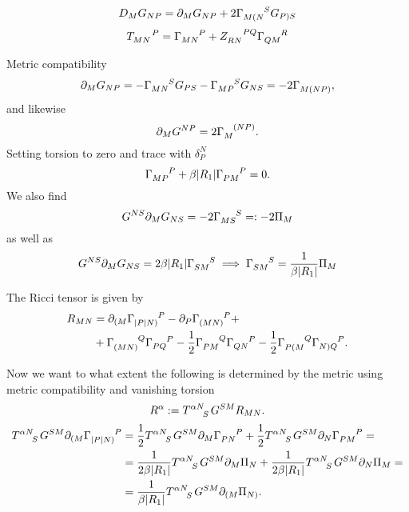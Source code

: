 \documentclass{article}
\begin{document}
\begin{equation}
    D_MG_{NP} = \pd_M G_{NP}+2\tensor{\Gamma}{_{M(N}^S}G_{P)S}
\end{equation}
\begin{equation}
    \tensor{T}{_{MN}^P} = \tensor{\Gamma}{_{MN}^P}+\tensor{Z}{_{RN}^{PQ}}\tensor{\Gamma}{_{QM}^R}
\end{equation}

Metric compatibility 
\begin{equation}
    \pd_MG_{NP} = -\tensor{\Gamma}{_{MN}^S}G_{PS}-\tensor{\Gamma}{_{MP}^S}G_{NS} = -2\tensor{\Gamma}{_{M(NP)}},
\end{equation}
and likewise 
\begin{equation}
    \pd_MG^{NP} = 2\tensor{\Gamma}{_{M}^{(NP)}}.
\end{equation}
Setting torsion to zero and trace with $\delta_P^N$
\begin{equation}
    \tensor{\Gamma}{_{MP}^P}+\beta |R_1|\tensor{\Gamma}{_{PM}^P}=0.
\end{equation}
We also find 
\begin{equation}
    G^{NS}\pd_MG_{NS} = -2\tensor{\Gamma}{_{MS}^S} =: -2\Pi_M
\end{equation}
as well as 
\begin{equation}
    G^{NS}\pd_M G_{NS} = 2\beta |R_1|\tensor{\Gamma}{_S_M^S} \implies \tensor{\Gamma}{_S_M^S}=\frac{1}{\beta|R_1|}\Pi_M
\end{equation}

The Ricci tensor is given by 
\begin{align*}
    R_{MN} &= \pd_{(M}\tensor{\Gamma}{_{|P|N)}^P}-\pd_P\tensor{\Gamma}{_{(MN)}^P}+\\
    &+\tensor{\Gamma}{_{(MN)}^Q}\tensor{\Gamma}{_{PQ}^P}-\frac{1}{2}\tensor{\Gamma}{_{PM}^Q}\tensor{\Gamma}{_{QN}^P}-\frac{1}{2}\tensor{\Gamma}{_{P(M}^Q}\tensor{\Gamma}{_{N)Q}^P}.
\end{align*}

Now we want to what extent the following is determined by the metric using metric compatibility and vanishing torsion
\begin{equation}
    R^\alpha := \tensor{T}{^\alpha^N_{S}}G^{SM}R_{MN}.
\end{equation}
\begin{align}
    \tensor{T}{^\alpha^N_{S}}G^{SM}\pd_{(M}\tensor{\Gamma}{_{|P|N)}^P} &= \frac{1}{2}\tensor{T}{^\alpha^N_{S}}G^{SM}\pd_{M}\tensor{\Gamma}{_{PN}^P}+\frac{1}{2}\tensor{T}{^\alpha^N_{S}}G^{SM}\pd_{N}\tensor{\Gamma}{_{PM}^P} =\\
    &= \frac{1}{2\beta|R_1|}\tensor{T}{^\alpha^N_{S}}G^{SM}\pd_M\Pi_N+\frac{1}{2\beta |R_1|}\tensor{T}{^\alpha^N_{S}}G^{SM}\pd_N\Pi_M=\\
    &= \frac{1}{\beta|R_1|}\tensor{T}{^\alpha^N_{S}}G^{SM}\pd_{(M}\Pi_{N)}.
\end{align}
\end{document}
